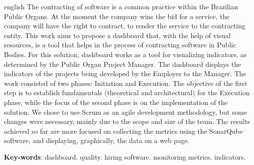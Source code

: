 \begin{resumo}[Abstract]
 \begin{otherlanguage*}{english}
   The contracting of software is a common practice within the Brazilian Public Organs. At the moment the company wins the bid for a service, the company will have the right to contract, to render the service to the contracting entity. This work aims to propose a dashboard that, with the help of visual resources, is a tool that helps in the process of contracting software in Public Bodies. For this solution, dashboard works as a tool for visualizing indicators, as determined by the Public Organ Project Manager. The dashboard displays the indicators of the projects being developed by the Employer to the Manager. The work consisted of two phases: Initiation and Execution. The objective of the first step is to establish fundamentals (theoretical and architectural) for the Execution phase, while the focus of the second phase is on the implementation of the solution. We chose to use Scrum as an agile development methodology, but some changes were necessary, mainly due to the scope and size of the team. The results achieved so far are more focused on collecting the metrics using the SonarQube software, and displaying, graphically, the data on a web page.

   \vspace{\onelineskip}
 
   \noindent 
   \textbf{Key-words}: dashboard. quality. hiring software. monitoring metrics. indicators.
 \end{otherlanguage*}
\end{resumo}
